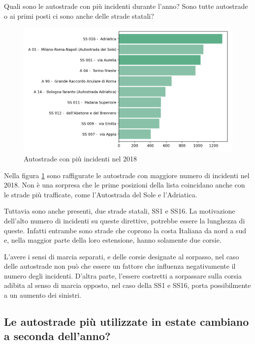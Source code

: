 \documentclass[a4paper]{report}
\begin{document}
Quali sono le autostrade con più incidenti durante l'anno? 
Sono tutte autostrade o ai primi posti ci sono anche delle strade statali? 

\begin{figure}
    \includegraphics[width=\linewidth]{../src/incidenti/incidenti_aci/autostrade/autostrade.png}
    \caption{Autostrade con più incidenti nel 2018}
    \label{fig:incidenti-autostrade}
\end{figure}

Nella figura \ref{fig:incidenti-autostrade} sono  raffigurate le autostrade con 
maggiore numero di incidenti nel 2018. 
Non è una sorpresa che le prime posizioni della lista coincidano 
anche con le strade più trafficate, come l'Autostrada del Sole e l'Adriatica.

Tuttavia sono anche presenti, due strade statali, SS1 e SS16. 
La motivazione dell'alto numero di incidenti su queste direttive, potrebbe essere 
la lunghezza di queste. Infatti entrambe sono strade che coprono la costa Italiana 
da nord a sud e, nella maggior parte della loro estensione, 
hanno solamente due corsie.

L'avere i sensi di marcia separati, e delle corsie designate al sorpasso, nel caso 
delle autostrade non può che essere un fattore che influenza negativamente 
il numero degli incidenti. 
D'altra parte, l'essere costretti a sorpassare sulla corsia adibita al senso di 
marcia opposto, nel caso della SS1 e SS16, porta possibilmente a un aumento dei 
sinistri.

\subsection{Le autostrade più utilizzate in estate cambiano a seconda dell'anno?}
\end{document}
